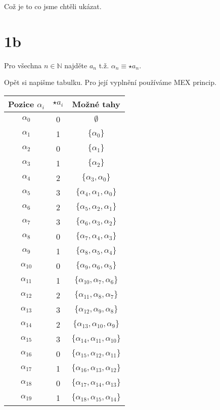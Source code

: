\documentclass[../main.tex]{subfiles}
\begin{document}
Což je to co jsme chtěli ukázat. 


\section*{1b}


Pro všechna $n \in \mathbb{N}$ najděte $a_n$ t.ž. $\alpha_n \equiv \star a_n$.


Opět si napišme tabulku. Pro její vyplnění používáme MEX princip. 

\begin{center}
    \begin{tabular}{|c|c|c|}
        \hline
        Pozice $\alpha_i$ & $\star a_i$ & Možné tahy \\
        \hline
        $\alpha_0$ & 0 & $\emptyset$ \\
        \hline
        $\alpha_1$ & 1 & $\{ \alpha_0 \}$ \\
        \hline
        $\alpha_2$ & 0 & $\{ \alpha_1 \}$ \\
        \hline
        $\alpha_3$ & 1 & $\{ \alpha_2 \}$ \\
        \hline
        $\alpha_4$ & 2 & $\{ \alpha_3, \alpha_0 \}$ \\
        \hline
        $\alpha_5$ & 3 & $\{ \alpha_4,  \alpha_1, \alpha_0 \}$ \\
        \hline
        $\alpha_6$ & 2 & $\{ \alpha_5,  \alpha_2, \alpha_1 \}$ \\
        \hline
        $\alpha_7$ & 3 & $\{ \alpha_6,  \alpha_3, \alpha_2 \}$ \\
        \hline
        $\alpha_8$ & 0 & $\{ \alpha_7,  \alpha_4, \alpha_3 \}$ \\
        \hline
        $\alpha_9$ & 1 & $\{ \alpha_8,  \alpha_5, \alpha_4 \}$ \\
        \hline
        $\alpha_{10}$ & 0 & $\{ \alpha_9,  \alpha_6, \alpha_5 \}$ \\
        \hline
        $\alpha_{11}$ & 1 & $\{ \alpha_{10},  \alpha_7, \alpha_6 \}$ \\
        \hline
        $\alpha_{12}$ & 2 & $\{ \alpha_{11},  \alpha_8, \alpha_7 \}$ \\
        \hline
        $\alpha_{13}$ & 3 & $\{ \alpha_{12},  \alpha_9, \alpha_8 \}$ \\
        \hline
        $\alpha_{14}$ & 2 & $\{ \alpha_{13},  \alpha_{10}, \alpha_9 \}$ \\
        \hline
        $\alpha_{15}$ & 3 & $\{ \alpha_{14},  \alpha_{11}, \alpha_{10} \}$ \\
        \hline
        $\alpha_{16}$ & 0 & $\{ \alpha_{15},  \alpha_{12}, \alpha_{11} \}$ \\
        \hline
        $\alpha_{17}$ & 1 & $\{ \alpha_{16},  \alpha_{13}, \alpha_{12} \}$ \\
        \hline
        $\alpha_{18}$ & 0 & $\{ \alpha_{17},  \alpha_{14}, \alpha_{13} \}$ \\
        \hline
        $\alpha_{19}$ & 1 & $\{ \alpha_{18},  \alpha_{15}, \alpha_{14} \}$ \\
        \hline
    \end{tabular}

\end{center}
\end{document}
